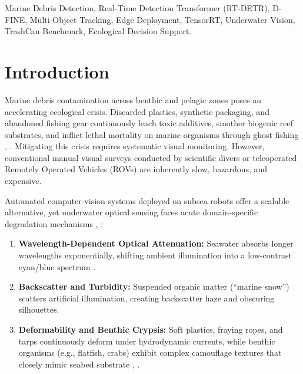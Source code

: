 \documentclass[conference]{IEEEtran}
\begin{document}
\begin{IEEEkeywords}
Marine Debris Detection, Real-Time Detection Transformer (RT-DETR), D-FINE, Multi-Object Tracking, Edge Deployment, TensorRT, Underwater Vision, TrashCan Benchmark, Ecological Decision Support.
\end{IEEEkeywords}

\section{Introduction}

Marine debris contamination across benthic and pelagic zones poses an accelerating ecological crisis. Discarded plastics, synthetic packaging, and abandoned fishing gear continuously leach toxic additives, smother biogenic reef substrates, and inflict lethal mortality on marine organisms through ghost fishing \cite{trashcan}, \cite{jaffe}. Mitigating this crisis requires systematic visual monitoring. However, conventional manual visual surveys conducted by scientific divers or teleoperated Remotely Operated Vehicles (ROVs) are inherently slow, hazardous, and expensive.

Automated computer-vision systems deployed on subsea robots offer a scalable alternative, yet underwater optical sensing faces acute domain-specific degradation mechanisms \cite{jaffe}, \cite{yolo11_base}:
\begin{enumerate}
    \item \textbf{Wavelength-Dependent Optical Attenuation:} Seawater absorbs longer wavelengths exponentially, shifting ambient illumination into a low-contrast cyan/blue spectrum \cite{jaffe}.
    \item \textbf{Backscatter and Turbidity:} Suspended organic matter (``marine snow'') scatters artificial illumination, creating backscatter haze and obscuring silhouettes.
    \item \textbf{Deformability and Benthic Crypsis:} Soft plastics, fraying ropes, and tarps continuously deform under hydrodynamic currents, while benthic organisms (e.g., flatfish, crabs) exhibit complex camouflage textures that closely mimic seabed substrate \cite{trashcan}, \cite{yolo11_base}.
\end{enumerate}
\end{document}
